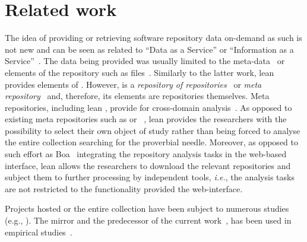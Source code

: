 
\section{Related work}
\label{sec:relwork}

The idea of providing or retrieving software repository data on-demand as such is not new
and can be seen as related to ``Data as a Service'' or ``Information as a Service''~\cite{Dan2007IaaS}.
The data being provided was usually limited to the meta-data~\cite{Codebook} or elements of the
repository such as files~\cite{Voinea2006Mining}.
Similarly to the latter work, lean \ght provides elements of \gh.
However, \gh is a \emph{repository of repositories}~\cite{Sowe2007Using} or
\emph{meta repository}~\cite{Gruhn2013Security} and, therefore, its elements are repositories themselves.
Meta repositories, including lean \ght, provide for cross-domain analysis~\cite{Sowe2007Using}.
As opposed to existing meta repositories such as \ohloh or \flossmole~\cite{Howisom2006FLOSSmole}, %
lean \ght provides the researchers with the possibility to select their own object of study rather than
being forced to analyse the entire collection searching for the proverbial needle.%
Moreover, as opposed to such effort as Boa~\cite{Dyer-Nguyen-Rajan-Nguyen-13} integrating the repository analysis 
tasks in the web-based interface, lean \ght allows the researchers to download the relevant repositories
and subject them to further processing by independent tools, \emph{i.e.}, the analysis tasks are not restricted to
the functionality provided the web-interface.

Projects hosted \gh or the entire \gh collection have been subject to numerous studies (e.g., \cite{allamanis2013mining,dabbish2012social,heller2011visualizing,%
gousios2014exploratory,%
lee2013git,%
pham2013building,%
pletea2014security,%
thung2013network}).
The \gh mirror and the predecessor of the current work~\cite{gousios2012ghtorent},
has been used in empirical studies~\cite{squire2014forge,vasilescu2013stackoverflow}.

